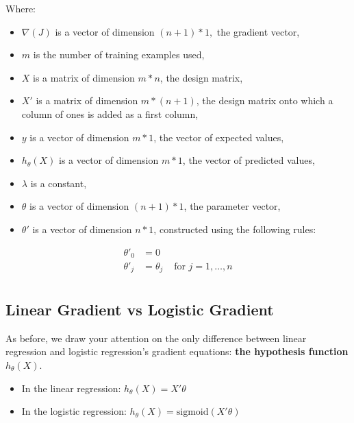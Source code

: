 \documentclass[]{article}
\begin{document}
Where:

\begin{itemize}
\item
  \(\nabla(J)\) is a vector of dimension \((n + 1) * 1,\) the gradient
  vector,
\item
  \(m\) is the number of training examples used,
\item
  \(X\) is a matrix of dimension \(m * n\), the design matrix,
\item
  \(X'\) is a matrix of dimension \(m * (n + 1)\), the design matrix
  onto which a column of ones is added as a first column,
\item
  \(y\) is a vector of dimension \(m * 1\), the vector of expected
  values,
\item
  \(h_\theta(X)\) is a vector of dimension \(m * 1\), the vector of
  predicted values,
\item
  \(\lambda\) is a constant,
\item
  \(\theta\) is a vector of dimension \((n + 1) * 1\), the parameter
  vector,
\item
  \(\theta'\) is a vector of dimension \(n * 1\), constructed using the
  following rules:
\end{itemize}

\large

\[
\begin{matrix}
\theta'_0 & =  0 \\
\theta'_j & =  \theta_j & \text{ for } j = 1, \dots, n\\    
\end{matrix}
\] \normalsize

\hypertarget{linear-gradient-vs-logistic-gradient}{%
\subsection{Linear Gradient vs Logistic
Gradient}\label{linear-gradient-vs-logistic-gradient}}

As before, we draw your attention on the only difference between linear
regression and logistic regression's gradient equations: \textbf{the
hypothesis function} \(h_\theta(X)\).

\begin{itemize}
\item
  In the linear regression: \(h_\theta(X) = X'\theta\)
\item
  In the logistic regression: \(h_\theta(X) = \text{sigmoid}(X'\theta)\)
  \clearpage
\end{itemize}
\end{document}
